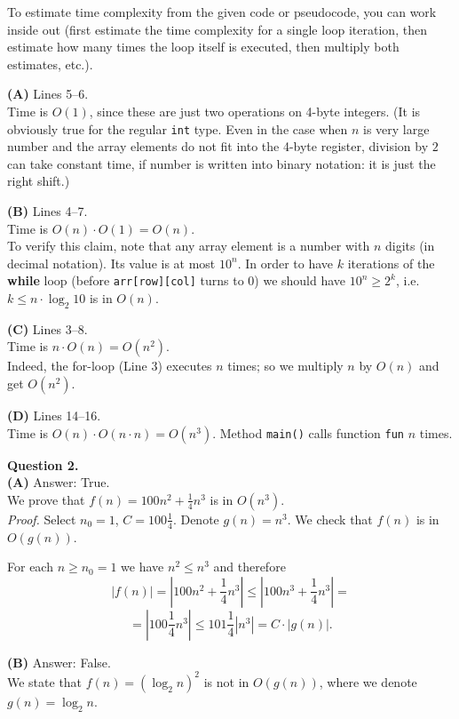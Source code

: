 \documentclass[a4paper,12pt]{article}
\begin{document}
To estimate time complexity from the given code or pseudocode, 
you can work inside out (first estimate the time complexity for 
a single loop iteration, then estimate how many times the loop itself is executed, 
then multiply both estimates, etc.). 


{\bf (A)} Lines 5--6.\\ 
Time is $O(1)$, since these are 
just two operations on 4-byte integers. 
(It is obviously true for the regular {\tt int} type. 
Even in the case when $n$ is very large number and the
array elements do not fit into the 4-byte register, 
division by $2$ can take constant time, if number is 
written into binary notation: it is just the right shift.)

{\bf (B)} Lines 4--7.\\
Time is $O(n) \cdot O(1) = O(n)$.\\
To verify this claim, note that 
any array element is a number with $n$ digits 
(in decimal notation).
Its value is at most $10^n$. 
In order to have $k$ iterations of the {\bf while} 
loop (before {\tt arr[row][col]} turns to $0$) we should
have $10^n \geq 2^k$, i.e. $k \leq n \cdot \log_2 10$ is in $O(n)$.

{\bf (C)} Lines 3--8.\\
Time is $n \cdot  O(n) = O(n^2)$.\\
Indeed, the for-loop (Line 3) executes $n$ times; 
so we multiply $n$ by $O(n)$ and get $O(n^2)$.

{\bf (D)} Lines 14--16.\\
Time is $O(n) \cdot O(n \cdot n) = O(n^3)$. 
Method {\tt main()} calls function {\tt fun} 
$n$ times.


\vspace{20pt}
{\bf Question 2.}\\
{\bf (A)} Answer: True.\\
We prove that $f(n) = 100n^2 + \frac{1}{4}n^3$ 
is in $O(n^3)$.\\
{\em Proof.} Select $n_0 = 1$, $C = 100\frac{1}{4}$.
Denote $g(n) = n^3$. We check that $f(n)$ is in $O(g(n))$. 

For each $n \geq n_0 =1$ we have $n^2 \leq n^3$ and therefore
$$|f(n)| = |100n^2 + \frac{1}{4}n^3| \leq |100n^3 + \frac{1}{4}n^3| =$$
$$= |100\frac{1}{4}n^3| \leq 101\frac{1}{4}|n^3| = C \cdot |g(n)|.$$


{\bf (B)} Answer: False.\\
We state that $f(n) = (\log_2 n)^2$
is not in $O(g(n))$, where we denote $g(n) = \log_2 n$. 
\end{document}
